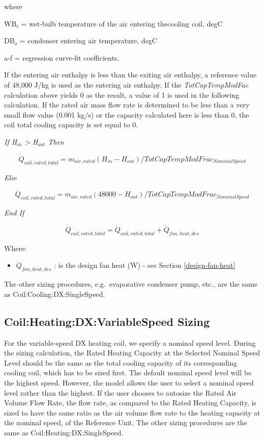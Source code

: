 where

WB\(_{i}\) = wet-bulb temperature of the air entering thecooling coil, degC

DB\(_{o}\) = condenser entering air temperature, degC

a-f = regression curve-fit coefficients.

If the entering air enthalpy is less than the exiting air enthalpy, a reference value of 48,000 J/kg is used as the entering air enthalpy. If the \emph{TotCapTempModFac} calculation above yields 0 as the result, a value of 1 is used in the following calculation. If the rated air mass flow rate is determined to be less than a very small flow value (0.001 kg/s) or the capacity calculated here is less than 0, the coil total cooling capacity is set equal to 0.

\emph{If H\(_{in}\) \textgreater{} H\(_{out}\) Then}

\begin{equation}
{\dot{Q}_{coil,rated,total}} = {m_{air,rated}}({H_{in}} - {H_{out}})/TotCapTempModFra{c_{NominalSpeed}}
\end{equation}

\emph{Else}

\begin{equation}
{\dot{Q}_{coil,rated,total}} = {m_{air,rated}}(48000 - {H_{out}})/TotCapTempModFra{c_{NominalSpeed}}
\end{equation}

\emph{End If}

\begin{equation}
{\dot{Q}_{coil,rated,total}} = {\dot{Q}_{coil,rated,total}} + \dot{Q}_{fan,heat,des}
\end{equation}

Where:

\begin{itemize}
\item
  \(\dot{Q}_{fan,heat,des}\) : is the design fan heat (W) - see Section \ref{design-fan-heat}
\end{itemize}


The other sizing procedures, e.g.~evaporative condenser pump, etc., are the same as Coil:Cooling:DX:SingleSpeed.

\subsection{Coil:Heating:DX:VariableSpeed Sizing}\label{coilheatingdxvariablespeed-sizing}

For the variable-speed DX heating coil, we specify a nominal speed level. During the sizing calculation, the Rated Heating Capacity at the Selected Nominal Speed Level should be the same as the total cooling capacity of its corresponding cooling coil, which has to be sized first. The default nominal speed level will be the highest speed. However, the model allows the user to select a nominal speed level rather than the highest. If the user chooses to autosize the Rated Air Volume Flow Rate, the flow rate, as compared to the Rated Heating Capacity, is sized to have the same ratio as the air volume flow rate to the heating capacity at the nominal speed, of the Reference Unit. The other sizing procedures are the same as Coil:Heating:DX:SingleSpeed.

